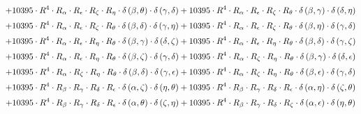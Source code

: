 \begin{subequations}
\begin{gather}
 \\[0.2em] \notag 		 + 10395 \cdot R^{4} \cdot R_{\alpha{}} \cdot R_{\epsilon{}} \cdot R_{\zeta{}} \cdot R_{\eta{}} \cdot \delta{}\left(\beta{}, \theta{}\right) \cdot \delta{}\left(\gamma{}, \delta{}\right)+ 10395 \cdot R^{4} \cdot R_{\alpha{}} \cdot R_{\epsilon{}} \cdot R_{\zeta{}} \cdot R_{\theta{}} \cdot \delta{}\left(\beta{}, \gamma{}\right) \cdot \delta{}\left(\delta{}, \eta{}\right) 
 \\[0.2em] \notag 		 + 10395 \cdot R^{4} \cdot R_{\alpha{}} \cdot R_{\epsilon{}} \cdot R_{\zeta{}} \cdot R_{\theta{}} \cdot \delta{}\left(\beta{}, \delta{}\right) \cdot \delta{}\left(\gamma{}, \eta{}\right)+ 10395 \cdot R^{4} \cdot R_{\alpha{}} \cdot R_{\epsilon{}} \cdot R_{\zeta{}} \cdot R_{\theta{}} \cdot \delta{}\left(\beta{}, \eta{}\right) \cdot \delta{}\left(\gamma{}, \delta{}\right) 
 \\[0.2em] \notag 		 + 10395 \cdot R^{4} \cdot R_{\alpha{}} \cdot R_{\epsilon{}} \cdot R_{\eta{}} \cdot R_{\theta{}} \cdot \delta{}\left(\beta{}, \gamma{}\right) \cdot \delta{}\left(\delta{}, \zeta{}\right)+ 10395 \cdot R^{4} \cdot R_{\alpha{}} \cdot R_{\epsilon{}} \cdot R_{\eta{}} \cdot R_{\theta{}} \cdot \delta{}\left(\beta{}, \delta{}\right) \cdot \delta{}\left(\gamma{}, \zeta{}\right) 
 \\[0.2em] \notag 		 + 10395 \cdot R^{4} \cdot R_{\alpha{}} \cdot R_{\epsilon{}} \cdot R_{\eta{}} \cdot R_{\theta{}} \cdot \delta{}\left(\beta{}, \zeta{}\right) \cdot \delta{}\left(\gamma{}, \delta{}\right)+ 10395 \cdot R^{4} \cdot R_{\alpha{}} \cdot R_{\zeta{}} \cdot R_{\eta{}} \cdot R_{\theta{}} \cdot \delta{}\left(\beta{}, \gamma{}\right) \cdot \delta{}\left(\delta{}, \epsilon{}\right) 
 \\[0.2em] \notag 		 + 10395 \cdot R^{4} \cdot R_{\alpha{}} \cdot R_{\zeta{}} \cdot R_{\eta{}} \cdot R_{\theta{}} \cdot \delta{}\left(\beta{}, \delta{}\right) \cdot \delta{}\left(\gamma{}, \epsilon{}\right)+ 10395 \cdot R^{4} \cdot R_{\alpha{}} \cdot R_{\zeta{}} \cdot R_{\eta{}} \cdot R_{\theta{}} \cdot \delta{}\left(\beta{}, \epsilon{}\right) \cdot \delta{}\left(\gamma{}, \delta{}\right) 
 \\[0.2em] \notag 		 + 10395 \cdot R^{4} \cdot R_{\beta{}} \cdot R_{\gamma{}} \cdot R_{\delta{}} \cdot R_{\epsilon{}} \cdot \delta{}\left(\alpha{}, \zeta{}\right) \cdot \delta{}\left(\eta{}, \theta{}\right)+ 10395 \cdot R^{4} \cdot R_{\beta{}} \cdot R_{\gamma{}} \cdot R_{\delta{}} \cdot R_{\epsilon{}} \cdot \delta{}\left(\alpha{}, \eta{}\right) \cdot \delta{}\left(\zeta{}, \theta{}\right) 
 \\[0.2em] \notag 		 + 10395 \cdot R^{4} \cdot R_{\beta{}} \cdot R_{\gamma{}} \cdot R_{\delta{}} \cdot R_{\epsilon{}} \cdot \delta{}\left(\alpha{}, \theta{}\right) \cdot \delta{}\left(\zeta{}, \eta{}\right)+ 10395 \cdot R^{4} \cdot R_{\beta{}} \cdot R_{\gamma{}} \cdot R_{\delta{}} \cdot R_{\zeta{}} \cdot \delta{}\left(\alpha{}, \epsilon{}\right) \cdot \delta{}\left(\eta{}, \theta{}\right) 

\end{gather}
\end{subequations}
